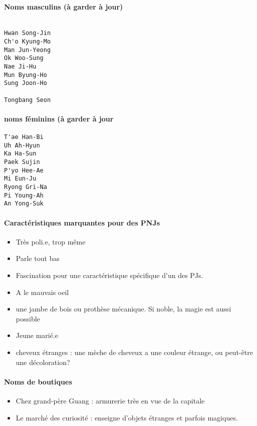 \documentclass[10pt,a4paper]{book}
\begin{document}
\paragraph{Noms masculins (à garder à jour)}
\begin{verbatim}

Hwan Song-Jin
Ch'o Kyung-Mo
Man Jun-Yeong
Ok Woo-Sung
Nae Ji-Hu
Mun Byung-Ho
Sung Joon-Ho

Tongbang Seon
\end{verbatim}
\paragraph{noms féminins (à garder à jour}
\begin{verbatim}
T'ae Han-Bi
Uh Ah-Hyun
Ka Ha-Sun
Paek Sujin
P'yo Hee-Ae
Mi Eun-Ju
Ryong Gri-Na
Pi Young-Ah
An Yong-Suk
\end{verbatim}
\paragraph{Caractéristiques marquantes pour des PNJs}
\begin{itemize}
\item Très poli.e, trop même
\item Parle tout bas
\item Fascination pour une caractéristique spécifique d'un des PJs.
\item A le mauvais oeil
\item une jambe de bois ou prothèse mécanique. Si noble, la magie est aussi possible
\item Jeune marié.e
\item cheveux étranges : une mèche de cheveux a une couleur étrange, ou peut-être une décoloration?
\end{itemize}
\paragraph{Noms de boutiques}
\begin{itemize}
\item Chez grand-père Guang : armurerie très en vue de la capitale
\item Le marché des curiosité : enseigne d'objets étranges et parfois magiques.
\end{itemize}
\end{document}

